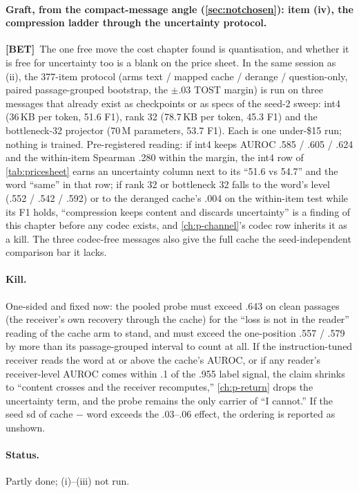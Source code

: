 \documentclass[11pt,a4paper]{report}
\newcommand{\BET}{\textcolor{betc}{\textbf{\scriptsize[BET]}}}
\begin{document}
\paragraph{Graft, from the compact-message angle (\cref{sec:notchosen}): item (iv), the compression ladder through the uncertainty protocol.} \BET\ The one free move the cost chapter found is quantisation, and whether it is free for uncertainty too is a blank on the price sheet. In the same session as (ii), the 377-item protocol (arms text / mapped cache / derange / question-only, paired passage-grouped bootstrap, the $\pm .03$ TOST margin) is run on three messages that already exist as checkpoints or as specs of the seed-2 sweep: int4 (36\,KB per token, 51.6 F1), rank 32 (78.7\,KB per token, 45.3 F1) and the bottleneck-32 projector (70\,M parameters, 53.7 F1). Each is one under-\$15 run; nothing is trained. Pre-registered reading: if int4 keeps AUROC .585 / .605 / .624 and the within-item Spearman .280 within the margin, the int4 row of \cref{tab:pricesheet} earns an uncertainty column next to its ``51.6 vs 54.7'' and the word ``same'' in that row; if rank 32 or bottleneck 32 falls to the word's level (.552 / .542 / .592) or to the deranged cache's .004 on the within-item test while its F1 holds, ``compression keeps content and discards uncertainty'' is a finding of this chapter before any codec exists, and \cref{ch:p-channel}'s codec row inherits it as a kill. The three codec-free messages also give the full cache the seed-independent comparison bar it lacks.

\paragraph{Kill.} One-sided and fixed now: the pooled probe must exceed .643 on clean passages (the receiver's own recovery through the cache) for the ``loss is not in the reader'' reading of the cache arm to stand, and must exceed the one-position .557 / .579 by more than its passage-grouped interval to count at all. If the instruction-tuned receiver reads the word at or above the cache's AUROC, or if any reader's receiver-level AUROC comes within .1 of the .955 label signal, the claim shrinks to ``content crosses and the receiver recomputes,'' \cref{ch:p-return} drops the uncertainty term, and the probe remains the only carrier of ``I cannot.'' If the seed sd of cache $-$ word exceeds the .03--.06 effect, the ordering is reported as unshown.

\paragraph{Status.} Partly done; (i)--(iii) not run.
\end{document}
